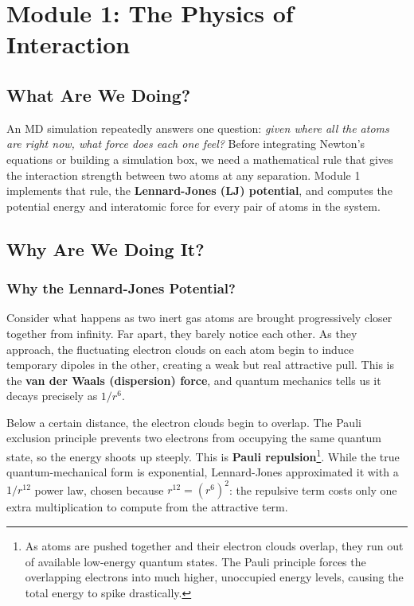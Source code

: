 \section{Module 1: The Physics of Interaction}

\subsection{What Are We Doing?}

An MD simulation repeatedly answers one question: \textit{given where all the atoms are right now, what force does each one feel?} Before integrating Newton's equations or building a simulation box, we need a mathematical rule that gives the interaction strength between two atoms at any separation. Module 1 implements that rule, the \textbf{Lennard-Jones (LJ) potential}, and computes the potential energy and interatomic force for every pair of atoms in the system.

\subsection{Why Are We Doing It?}

\subsubsection{Why the Lennard-Jones Potential?}

Consider what happens as two inert gas atoms are brought progressively closer together from infinity. Far apart, they barely notice each other. As they approach, the fluctuating electron clouds on each atom begin to induce temporary dipoles in the other, creating a weak but real attractive pull. This is the \textbf{van der Waals (dispersion) force}, and quantum mechanics tells us it decays precisely as $1/r^6$.

Below a certain distance, the electron clouds begin to overlap. The Pauli exclusion principle prevents two electrons from occupying the same quantum state, so the energy shoots up steeply. This is \textbf{Pauli repulsion}\footnote[1]{As atoms are pushed together and their electron clouds overlap, they run out of available low-energy quantum states. The Pauli principle forces the overlapping electrons into much higher, unoccupied energy levels, causing the total energy to spike drastically.}. While the true quantum-mechanical form is exponential, Lennard-Jones approximated it with a $1/r^{12}$ power law, chosen because $r^{12} = (r^6)^2$: the repulsive term costs only one extra multiplication to compute from the attractive term.

